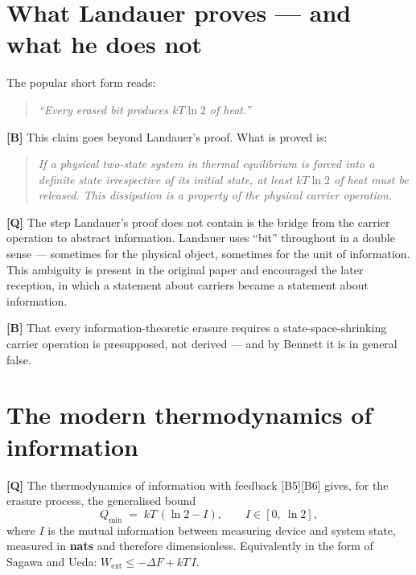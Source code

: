 \section{What Landauer proves --- and what he does not}

The popular short form reads:

\begin{quote}
\emph{“Every erased bit produces $kT\ln 2$ of heat.”}
\end{quote}

\textbf{[B]} This claim goes beyond Landauer's proof. What is proved is:

\begin{quote}
\emph{If a physical two-state system in thermal equilibrium is forced into a
definite state irrespective of its initial state, at least $kT\ln 2$ of heat must
be released. This dissipation is a property of the physical carrier operation.}
\end{quote}

\textbf{[Q]} The step Landauer's proof does not contain is the bridge from the carrier
operation to abstract information. Landauer uses “bit” throughout in a double
sense --- sometimes for the physical object, sometimes for the unit of
information. This ambiguity is present in the original paper and encouraged the
later reception, in which a statement about carriers became a statement about
information.

\textbf{[B]} That every information-theoretic erasure requires a state-space-shrinking
carrier operation is presupposed, not derived --- and by Bennett it is in general
false.

\section{The modern thermodynamics of information}

\textbf{[Q]} The thermodynamics of information with feedback [B5][B6] gives, for the
erasure process, the generalised bound
\begin{equation}
  Q_{\min} \;=\; k T\,(\ln 2 - I), \qquad I \in [0,\ \ln 2],
  \label{eq:feedback}
\end{equation}
where $I$ is the mutual information between measuring device and system state,
measured in \textbf{nats} and therefore dimensionless. Equivalently in the form of
Sagawa and Ueda: $W_{\text{ext}} \le -\Delta F + kT\,I$.

